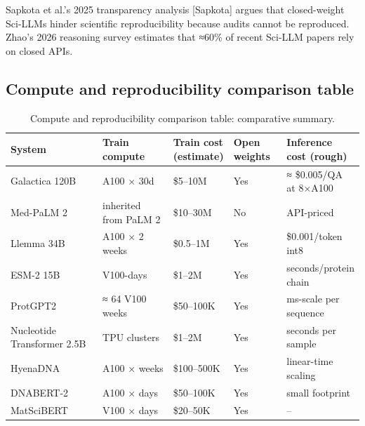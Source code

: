 \documentclass{article}
\begin{document}
Sapkota et al.'s 2025 transparency analysis {[}Sapkota{]} argues that closed-weight Sci-LLMs hinder scientific reproducibility because audits cannot be reproduced. Zhao's 2026 reasoning survey \cite{zhao2026appliedandcomputat} estimates that ≈60\% of recent Sci-LLM papers rely on closed APIs.

\subsection{Compute and reproducibility comparison table}\label{compute-and-reproducibility-comparison-table}

\begin{table}[t]
\centering
\caption{Compute and reproducibility comparison table: comparative summary.}
\label{tab:compute-and-reproducibility-comparison-table}
\begin{tabular}{>{\raggedright\arraybackslash}p{0.2689\linewidth}
  >{\raggedright\arraybackslash}p{0.2017\linewidth}
  >{\raggedright\arraybackslash}p{0.1765\linewidth}
  >{\raggedright\arraybackslash}p{0.1597\linewidth}
  >{\raggedright\arraybackslash}p{0.1933\linewidth}}
\toprule
System & Train compute & Train cost (estimate) & Open weights & Inference cost (rough) \\
\midrule
Galactica 120B \cite{taylor2022arxiv2211090852022} & 1024 A100 × 30d & \$5--10M & Yes & ≈ \$0.005/QA at 8×A100 \\
Med-PaLM 2 \cite{singhal2025towardexpertlevelm} & inherited from PaLM 2 & \$10--30M & No & API-priced \\
Llemma 34B \cite{azerbayev2023llemmaanopenlangua} & 256 A100 × 2 weeks & \$0.5--1M & Yes & \$0.001/token int8 \\
ESM-2 15B \cite{lin2022evolutionaryscalep} & 6400 V100-days & \$1--2M & Yes & seconds/protein chain \\
ProtGPT2 \cite{ferruz2022naturecommunicatio} & ≈ 64 V100 weeks & \$50--100K & Yes & ms-scale per sequence \\
Nucleotide Transformer 2.5B \cite{dallatorre2024nucleotidetransfor} & TPU clusters & \$1--2M & Yes & seconds per sample \\
HyenaDNA \cite{nguyen2023hyenadnalongrangeg} & A100 × weeks & \$100--500K & Yes & linear-time scaling \\
DNABERT-2 \cite{zhou2023arxiv2306150062023} & A100 × days & \$50--100K & Yes & small footprint \\
MatSciBERT \cite{gupta2022matscibertamateria} & V100 × days & \$20--50K & Yes & -- \\

\end{tabular}
\end{table}
\end{document}

